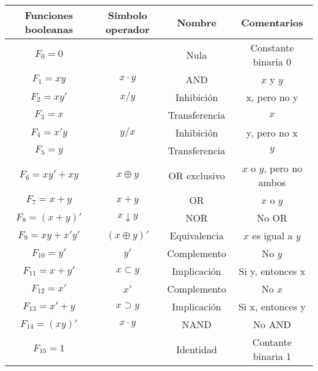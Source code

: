 \begin{table}[h]
    \centering
    \begin{tabular}{cccc}
        \toprule Funciones booleanas & S\'{i}mbolo operador & Nombre          & Comentarios              \\
        \midrule $F_0 = 0$           &                      & Nula            & Constante binaria 0      \\
        $F_1 = xy$                   & $x \cdot y$          & AND             & $x$ y $y$                \\
        $F_2 = xy'$                  & $x/y$                & Inhibici\'{o}n  & x, pero no y             \\
        $F_3 = x$                    &                      & Transferencia   & $x$                      \\
        $F_4 = x'y$                  & $y/x$                & Inhibici\'{o}n  & y, pero no x             \\
        $F_5 = y$                    &                      & Transferencia   & $y$                      \\
        $F_6 = xy' + xy$             & $x \oplus y$         & OR exclusivo    & $x$ o $y$, pero no ambos \\
        $F_7 = x + y$                & $x + y$              & OR              & $x$ o $y$                \\
        $F_8 = (x + y)'$             & $x \downarrow y$     & NOR             & No OR                    \\
        $F_9 = xy + x'y'$            & $(x \oplus y)'$      & Equivalencia    & $x$ es igual a $y$       \\
        $F_{10} = y'$                & $y'$                 & Complemento     & No $y$                   \\
        $F_{11} = x + y'$            & $x \subset y$        & Implicaci\'{o}n & Si y, entonces x         \\
        $F_{12} = x'$                & $x'$                 & Complemento     & No $x$                   \\
        $F_{13} = x' + y$            & $x \supset y$        & Implicaci\'{o}n & Si x, entonces y         \\
        $F_{14} = (xy)'$             & $x \cdot y$          & NAND            & No AND                   \\
        $F_{15} = 1$                 &                      & Identidad       & Contante binaria 1       \\
        \bottomrule
    \end{tabular}
\end{table}
\newpage

